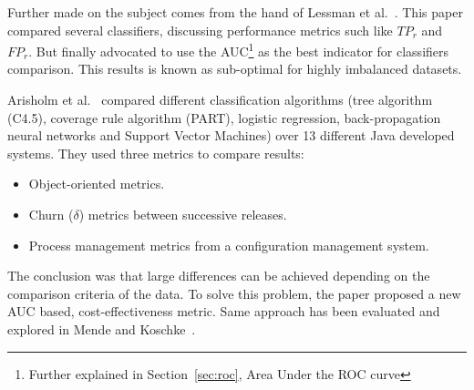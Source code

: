 Further made on the subject comes from the hand of Lessman et al.~\cite{LBMP08}.
This paper compared several classifiers, discussing performance metrics such 
like $TP_r$ and $FP_r$. But finally advocated to use the AUC\footnote{Further 
explained in Section~\ref{sec:roc}, Area Under the ROC curve} as the best 
indicator for classifiers comparison. This results is known as sub-optimal for 
highly imbalanced datasets.

Arisholm et al.~\cite{Arisholm10} compared different classification
algorithms (tree algorithm (C4.5), coverage rule algorithm (PART), logistic 
regression, back-propagation neural networks and Support Vector Machines) over 
13 different Java developed systems. They used three metrics to compare results:

\begin{itemize}
    \item Object-oriented metrics.
    \item Churn ($\delta$) metrics between successive releases.
    \item Process management metrics from a configuration management system.
\end{itemize}

The conclusion was that large differences can be achieved depending on the 
comparison criteria of the data. To solve this problem, the paper proposed
a new AUC based, cost-effectiveness metric. Same approach has been evaluated 
and explored in Mende and Koschke~\cite{Mende10}.
